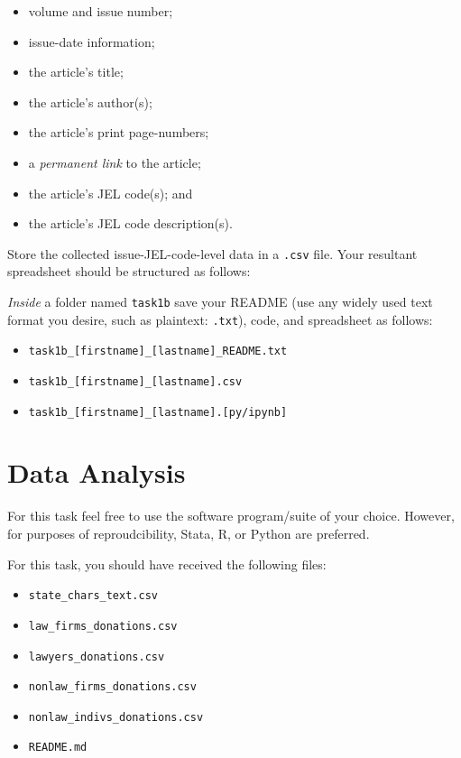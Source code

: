 \documentclass[11pt, letterpaper, twoside]{article}
\begin{document}
\begin{multicols}{2}
    \begin{itemize}
        \item volume and issue number;
        \item issue-date information;
        \item the article's title;
        \item the article's author(s);
        \item the article's print page-numbers;
        \item a \textit{permanent link} to the article;
        \item the article's JEL code(s); and 
        \item the article's JEL code description(s).
    \end{itemize}   
\end{multicols}

Store the collected issue-JEL-code-level data in a \verb|.csv| file. Your resultant spreadsheet should be structured as follows:

\textit{Inside} a folder named \verb|task1b| save your README (use any widely used text format you desire, such as plaintext: \verb|.txt|), code, and spreadsheet as follows:
\begin{itemize}
    \item \verb|task1b_[firstname]_[lastname]_README.txt|
    \item \verb|task1b_[firstname]_[lastname].csv|
    \item \verb|task1b_[firstname]_[lastname].[py/ipynb]|
\end{itemize}

\begin{landscape}
    \thispagestyle{empty}
    
\end{landscape}

\section{Data Analysis}

For this task feel free to use the software program/suite of your choice. However, for purposes of reproudcibility, Stata, R, or Python are preferred.

For this task, you should have received  the following files:
\begin{itemize}
    \item \verb|state_chars_text.csv|
    \item \verb|law_firms_donations.csv|
    \item \verb|lawyers_donations.csv|
    \item \verb|nonlaw_firms_donations.csv|
    \item \verb|nonlaw_indivs_donations.csv|
    \item \verb|README.md|
\end{itemize}
\end{document}
